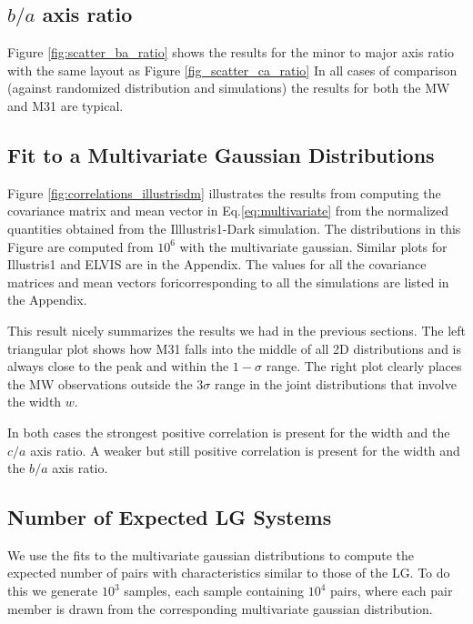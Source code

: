 \documentclass[a4paper,fleqn,usenatbib]{mnras}
\begin{document}
\subsection{$b/a$ axis ratio}

Figure \ref{fig:scatter_ba_ratio} shows the results for the minor to
major axis ratio with the same layout as Figure \ref{fig_scatter_ca_ratio}
In all cases of comparison (against randomized distribution
and simulations) the results for both the MW and M31 are typical. 


\subsection{Fit to a Multivariate Gaussian Distributions}

Figure \ref{fig:correlations_illustrisdm} illustrates the results from
 computing the covariance matrix and mean vector in
 Eq.\ref{eq:multivariate} from the normalized quantities obtained from
 the Illlustris1-Dark simulation.
The distributions in this Figure are computed from $10^6$ with the multivariate
gaussian. 
Similar plots for Illustris1 and ELVIS are in the Appendix.
The values for all the covariance matrices and mean vectors
foricorresponding to all the simulations are listed in the Appendix.

This result nicely summarizes the results we had in the previous
sections. The left triangular plot shows how M31 falls into the middle of all 2D
distributions and is always close to the peak and within the $1-\sigma$
range. 
The right plot clearly places the MW observations outside the
$3\sigma$ range in the joint distributions that involve the width
$w$. 

In both cases the strongest positive correlation is present for the
width and the $c/a$ axis ratio. A weaker but still positive
correlation is present for the width and the $b/a$ axis ratio.



\subsection{Number of Expected LG Systems}

We use the fits to the multivariate gaussian distributions to
compute the expected number of pairs with characteristics similar to
those of the LG.
To do this we generate $10^3$ samples, each sample containing $10^4$
pairs, where each pair member is drawn from the corresponding
multivariate gaussian distribution.  
\end{document}
